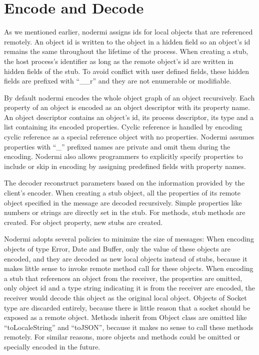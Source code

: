 \section{Encode and Decode}
As we mentioned earlier, nodermi assigns ids for local
objects that are referenced remotely.
An object id is written to the object in a hidden field
so an object's id remains the same throughout the lifetime of the process.
When creating a stub,
the host process's identifier as long as the remote object's id
are written in hidden fields of the stub.
To avoid conflict with user defined fields, these hidden fields are prefixed
with ``\_\_r'' and they are not enumerable or modifiable.

By default nodermi encodes the whole object graph of an object recursively.
Each property of an object is encoded 
as an object descriptor with its property name.
An object descriptor contains an object's id, its process descriptor,
its type and a list containing its encoded properties.
Cyclic reference is handled by encoding cyclic reference as
a special reference object with no properties.
Nodermi assumes properties with ``\_'' prefixed names are private
 and omit them during the encoding.
Nodermi also allows programmers to explicitly specify properties
to include or skip in encoding by assigning predefined fields 
with property names.

The decoder reconstruct parameters based on the information provided by the client's encoder.
When creating a stub object,
all the properties of its remote object specified in the message 
are decoded recursively.
Simple properties like numbers or strings are directly set in the stub.
For methods, stub methods are created. 
For object property, new stubs are created.

Nodermi adopts several policies to minimize the size of messages:
When encoding objects of type Error, Date and Buffer,
only the value of these objects are encoded,
and they are decoded as new local objects instead of stubs,
because it makes little sense to invoke remote method call for these objects.
When encoding a stub that references an object from the receiver,
the properties are omitted, only object id and a type string indicating 
it is from the receiver are encoded,
the receiver would decode this object as the original local object.
Objects of Socket type are discarded entirely, because
there is little reason that a socket should be exposed as a remote object.
Methods inherit from Object class are omitted like ``toLocaleString''
and ``toJSON'', because it makes no sense to call these methods remotely.
For similar reasons, 
more objects and methods could be omitted or specially encoded
in the future.


